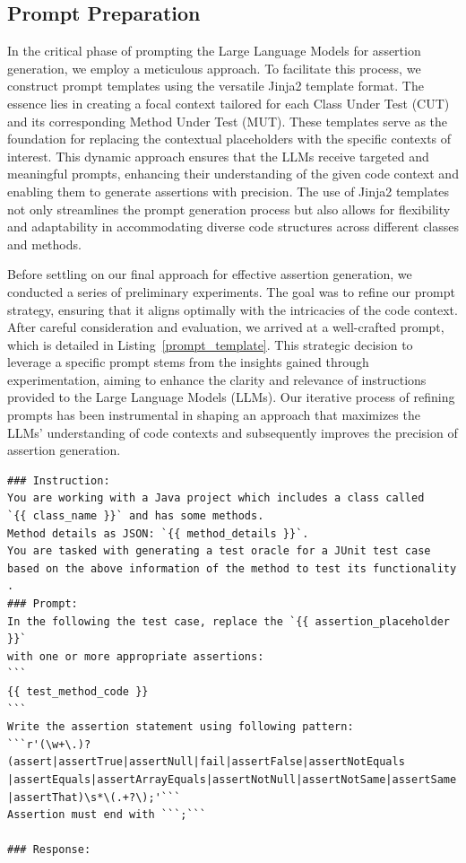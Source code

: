 \vspace{0.1 cm}
\subsection{Prompt Preparation}
\label{sec:prompt_preparation}
\vspace{0.1 cm}

In the critical phase of prompting the Large Language Models for assertion generation, we employ a meticulous approach. To facilitate this process, we construct prompt templates using the versatile Jinja2\cite{noauthor_jinja_nodate}
template format. The essence lies in creating a focal context tailored for each Class Under Test (CUT) and its corresponding Method Under Test (MUT). These templates serve as the foundation for replacing the contextual placeholders with the specific contexts of interest. This dynamic approach ensures that the LLMs receive targeted and meaningful prompts, enhancing their understanding of the given code context and enabling them to generate assertions with precision. The use of Jinja2 templates not only streamlines the prompt generation process but also allows for flexibility and adaptability in accommodating diverse code structures across different classes and methods.

Before settling on our final approach for effective assertion generation, we conducted a series of preliminary experiments. The goal was to refine our prompt strategy, ensuring that it aligns optimally with the intricacies of the code context. After careful consideration and evaluation, we arrived at a well-crafted prompt, which is detailed in Listing~\ref{prompt_template}. This strategic decision to leverage a specific prompt stems from the insights gained through experimentation, aiming to enhance the clarity and relevance of instructions provided to the Large Language Models (LLMs). Our iterative process of refining prompts has been instrumental in shaping an approach that maximizes the LLMs' understanding of code contexts and subsequently improves the precision of assertion generation.

\begin{lstlisting}[style=llm_prompt, label=prompt_template, caption=Prompt Template]
### Instruction:
You are working with a Java project which includes a class called 
`{{ class_name }}` and has some methods.
Method details as JSON: `{{ method_details }}`.
You are tasked with generating a test oracle for a JUnit test case 
based on the above information of the method to test its functionality .
### Prompt:
In the following the test case, replace the `{{ assertion_placeholder }}` 
with one or more appropriate assertions:
```
{{ test_method_code }}
```
Write the assertion statement using following pattern:
```r'(\w+\.)?(assert|assertTrue|assertNull|fail|assertFalse|assertNotEquals
|assertEquals|assertArrayEquals|assertNotNull|assertNotSame|assertSame
|assertThat)\s*\(.+?\);'```
Assertion must end with ```;```

### Response:
\end{lstlisting}

